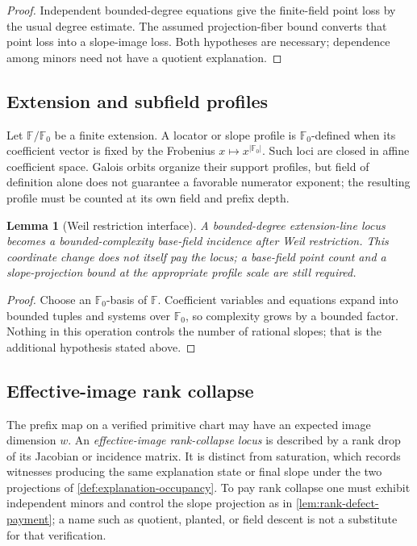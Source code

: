 \documentclass[12pt,a4paper]{amsart}
\numberwithin{equation}{section}
\newtheorem{lemma}[lemma]{Lemma}
\theoremstyle{remark}
\newcommand{\F}{\mathbb F}
\newcommand{\abs}[1]{\lvert #1\rvert}
\begin{document}
\begin{proof}
Independent bounded-degree equations give the finite-field point loss by
the usual degree estimate.  The assumed projection-fiber bound converts
that point loss into a slope-image loss.  Both hypotheses are necessary;
dependence among minors need not have a quotient explanation.
\end{proof}

\subsection*{Extension and subfield profiles}
Let \(\F/\F_0\) be a finite extension.  A locator or slope profile is \(\F_0\)-defined when its coefficient vector is fixed by the Frobenius \(x\mapsto x^{\abs{
\F_0}}\).  Such loci are closed in affine coefficient space.  Galois
orbits organize their support profiles, but field of definition alone does
not guarantee a favorable numerator exponent; the resulting profile must
be counted at its own field and prefix depth.

\begin{lemma}[Weil restriction interface]\label{lem:weil-restriction-expanded}
A bounded-degree extension-line locus becomes a bounded-complexity
base-field incidence after Weil restriction.  This coordinate change does
not itself pay the locus; a base-field point count and a slope-projection
bound at the appropriate profile scale are still required.
\end{lemma}

\begin{proof}
Choose an \(\F_0\)-basis of \(\F\).  Coefficient variables and equations
expand into bounded tuples and systems over \(\F_0\), so complexity grows
by a bounded factor.  Nothing in this operation controls the number of
rational slopes; that is the additional hypothesis stated above.
\end{proof}

\subsection*{Effective-image rank collapse}
The prefix map on a verified primitive chart may have an expected image
dimension \(w\).  An \emph{effective-image rank-collapse locus} is
described by a rank drop of its Jacobian or incidence matrix.  It is
distinct from saturation, which records witnesses producing the same
explanation state or final slope under the two projections of
\cref{def:explanation-occupancy}.  To pay rank collapse one must exhibit independent
minors and control the slope projection as in
\cref{lem:rank-defect-payment}; a name such as quotient, planted, or
field descent is not a substitute for that verification.
\end{document}
